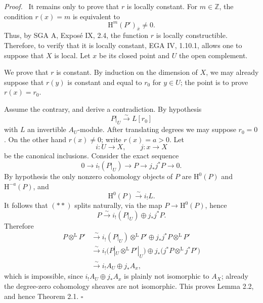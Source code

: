 \documentclass[12pt]{article}
\newcommand{\ZZ}{\mathbb Z}
\newcommand{\Hh}{\mathrm H}
\newcommand{\ol}[1]{\overline{#1}}
\newcommand{\qedtext}{\hfill$\square$}
\newenvironment{prooftext}[1][Proof]{\par\noindent\emph{#1.}\ }{\par\medskip}
\begin{document}
\begin{prooftext}
It remains only to prove that $r$ is locally constant. For $m\in\ZZ$, the condition $r(x)=m$ is equivalent to
\[
   \Hh^m(P')_{\ol{x}}\ne0.
\]
Thus, by SGA A, Exposé IX, 2.4, the function $r$ is locally constructible. Therefore, to verify that it is locally constant, EGA IV, 1.10.1, allows one to suppose that $X$ is local. Let $x$ be its closed point and $U$ the open complement.

We prove that $r$ is constant. By induction on the dimension of $X$, we may already suppose that $r(y)$ is constant and equal to $r_0$ for $y\in U$; the point is to prove $r(x)=r_0$.

Assume the contrary, and derive a contradiction. By hypothesis
\[
   P|_U\xrightarrow{\sim}L[r_0]
\]
with $L$ an invertible $A_U$-module. After translating degrees we may suppose $r_0=0$. On the other hand $r(x)\ne0$; write $r(x)=a>0$. Let
\[
   i:U\to X,
   \qquad
   j:x\to X
\]
be the canonical inclusions. Consider the exact sequence
\[
   0\longrightarrow i_!(P|_U)\longrightarrow P\longrightarrow j_*j^*P\longrightarrow0.\tag{**}
\]
By hypothesis the only nonzero cohomology objects of $P$ are $\Hh^0(P)$ and $\Hh^{-a}(P)$, and
\[
   \Hh^0(P)\xrightarrow{\sim}i_!L.
\]
It follows that $(**)$ splits naturally, via the map $P\to\Hh^0(P)$, hence
\[
   P\xrightarrow{\sim} i_!(P|_U)\oplus j_*j^*P.
\]
Therefore
\begin{align*}
P\otimes^{\mathrm L}P'
&\xrightarrow{\sim} i_!(P|_U)\otimes^{\mathrm L}P'
      \oplus j_*j^*P\otimes^{\mathrm L}P' \\
&\xrightarrow{\sim} i_!\bigl(P|_U\otimes^{\mathrm L}P'|_U\bigr)
      \oplus j_*\bigl(j^*P\otimes^{\mathrm L}j^*P'\bigr)\\
&\xrightarrow{\sim} i_!A_U\oplus j_*A_x,
\end{align*}
which is impossible, since $i_!A_U\oplus j_*A_x$ is plainly not isomorphic to $A_X$; already the degree-zero cohomology sheaves are not isomorphic. This proves Lemma 2.2, and hence Theorem 2.1. \qedtext
\end{prooftext}

\bigskip
\end{document}
